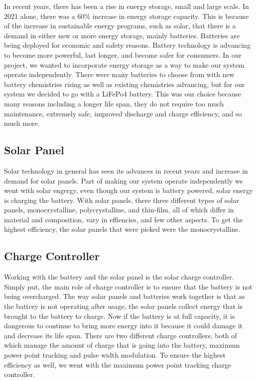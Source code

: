\documentclass[journal]{IEEEtran}
\begin{document}
In recent years, there has been a rise in energy storage, small and large scale. In 2021 alone, there 
was a 60\% increase in energy storage capacity. This is because of the increase in sustainable energy 
programs, such as solar, that there is a demand in either new or more energy storage, mainly batteries. 
Batteries are being deployed for economic and safety reasons. Battery technology is advancing to become 
more powerful, last longer, and become safer for consumers. In our project, we wanted to incorporate 
energy storage as a way to make our system operate independently. There were many batteries to choose 
from with new battery chemistries rising as well as existing chemistries advancing, but for our system 
we decided to go with a LiFePo4 battery. This was our choice because many reasons including a longer 
life span, they do not require too much maintenance, extremely safe, improved discharge and charge 
efficiency, and so much more. 
\subsection{Solar Panel} \label{sec:solar pane}
Solar technology in general has seen its advances in recent years and increase in demand for solar panels. 
Part of making our system operate independently we went with solar engergy, even though our system is 
battery powered, solar energy is charging the battery. With solar panels, there three different types of 
solar panels, monocrystalline, polycrystalline, and thin-film, all of which differ in material and 
composition, vary in effiencies, and few other aspects. To get the highest efficiency, the solar panels 
that were picked were the monocrystalline.
\subsection{Charge Controller} \label{sec:charge controller}
Working with the battery and the solar panel is the solar charge controller. Simply put, the main role of 
charge controller is to ensure that the battery is not being overcharged. The way solar panels and batteries 
work together is that as the battery is not operating after usage, the solar panels collect energy that 
is brought to the battery to charge. Now if the battery is at full capacity, it is dangerous to continue 
to bring more energy into it because it could damage it and decrease its life span. There are two different 
charge controllers, both of which manage the amount of charge that is going into the battery, maximum power 
point tracking and pulse width modulation. To ensure the highest efficiency as well, we went with the 
maximum power point tracking charge controller.
\end{document}
